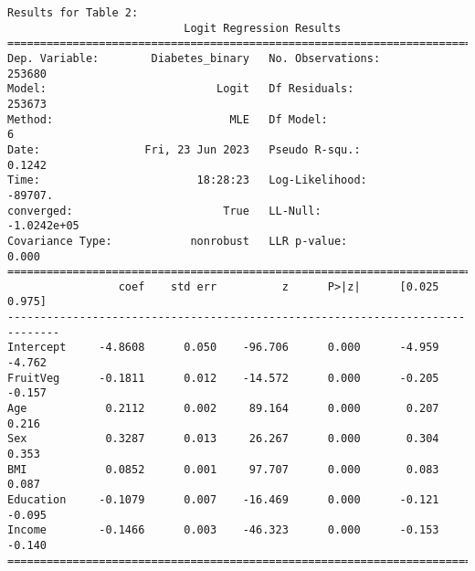 \documentclass[11pt]{article}
\begin{document}
\begin{footnotesize}
\begin{Verbatim}[tabsize=4]
Results for Table 2:
                           Logit Regression Results
==============================================================================
Dep. Variable:        Diabetes_binary   No. Observations:               253680
Model:                          Logit   Df Residuals:                   253673
Method:                           MLE   Df Model:                            6
Date:                Fri, 23 Jun 2023   Pseudo R-squ.:                  0.1242
Time:                        18:28:23   Log-Likelihood:                -89707.
converged:                       True   LL-Null:                   -1.0242e+05
Covariance Type:            nonrobust   LLR p-value:                     0.000
==============================================================================
                 coef    std err          z      P>|z|      [0.025      0.975]
------------------------------------------------------------------------------
Intercept     -4.8608      0.050    -96.706      0.000      -4.959      -4.762
FruitVeg      -0.1811      0.012    -14.572      0.000      -0.205      -0.157
Age            0.2112      0.002     89.164      0.000       0.207       0.216
Sex            0.3287      0.013     26.267      0.000       0.304       0.353
BMI            0.0852      0.001     97.707      0.000       0.083       0.087
Education     -0.1079      0.007    -16.469      0.000      -0.121      -0.095
Income        -0.1466      0.003    -46.323      0.000      -0.153      -0.140
==============================================================================


\end{Verbatim}
\end{footnotesize}
\end{document}
